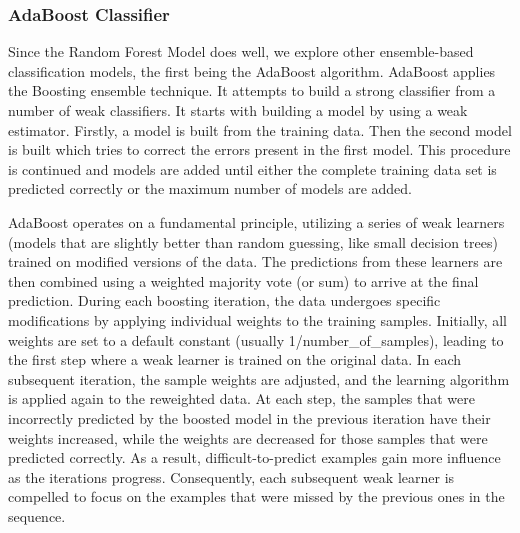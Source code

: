 \documentclass{article}
\begin{document}
\subsubsection{AdaBoost Classifier}
Since the Random Forest Model does well, we explore other ensemble-based classification models, the first being the AdaBoost algorithm. AdaBoost applies the Boosting ensemble technique. It attempts to build a strong classifier from a number of weak classifiers. It starts with building a model by using a weak estimator. Firstly, a model is built from the training data. Then the second model is built which tries to correct the errors present in the first model. This procedure is continued and models are added until either the complete training data set is predicted correctly or the maximum number of models are added.   

AdaBoost operates on a fundamental principle, utilizing a series of weak learners (models that are slightly better than random guessing, like small decision trees) trained on modified versions of the data. The predictions from these learners are then combined using a weighted majority vote (or sum) to arrive at the final prediction.
During each boosting iteration, the data undergoes specific modifications by applying individual weights to the training samples. Initially, all weights are set to a default constant (usually 1/number\_of\_samples), leading to the first step where a weak learner is trained on the original data. In each subsequent iteration, the sample weights are adjusted, and the learning algorithm is applied again to the reweighted data.
At each step, the samples that were incorrectly predicted by the boosted model in the previous iteration have their weights increased, while the weights are decreased for those samples that were predicted correctly. As a result, difficult-to-predict examples gain more influence as the iterations progress. Consequently, each subsequent weak learner is compelled to focus on the examples that were missed by the previous ones in the sequence.
\end{document}
